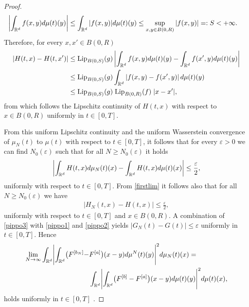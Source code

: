 \begin{proof}
	\begin{align*}
	\left|\int_{\mathbb{R}^d} f(x,y) d\mu(t)(y)\right| &\leq \int_{\mathbb{R}^d} |f(x,y)| d\mu(t)(y) \leq \sup_{x,y \in B(0,R)} |f(x,y)| =: S <+\infty.
	\end{align*}
	Therefore, for every $x, x' \in B(0,R)$
	\begin{align*}
	\left|H(t,x)-H(t,x')\right| &\leq \textup{Lip}_{B(0,S)} (g) \left|\int_{\mathbb{R}^d} f(x,y) d\mu(t)(y) - \int_{\mathbb{R}^d} f(x',y) d\mu(t)(y)\right| \\
	&\leq \textup{Lip}_{B(0,S)} (g) \int_{\mathbb{R}^d} \left|f(x,y)  - f(x',y)\right|  d\mu(t)(y)\\
	&\leq \textup{Lip}_{B(0,S)} (g) \; \textup{Lip}_{B(0,R)} (f) \; |x-x'|,
	\end{align*}
	from which follows the Lipschitz continuity of $H(t,x)$ with respect to $x \in B(0,R)$ uniformly in $t \in [0,T]$.
	
	From this uniform Lipschitz continuity and the uniform Wasserstein convergence of $\mu_N(t)$ to $\mu(t)$ with respect to $t \in [0,T]$, it follows that for every $\varepsilon > 0$ we can find $N_0(\varepsilon)$ such that for all $N \geq N_0(\varepsilon)$ it holds
	\begin{align}\label{pippo1}
		\left|\int_{\mathbb{R}^d}H(t,x)d\mu_N(t)(x) - \int_{\mathbb{R}^d}H(t,x)d\mu(t)(x)\right|\leq \frac{\varepsilon}{2},
	\end{align}
	uniformly with respect to $t \in [0,T]$. From \eqref{firstlim} it follows also that for all $N \geq N_0(\varepsilon)$ we have
	\begin{align}\label{pippo2}
	\left|H_N(t,x) - H(t,x)\right| \leq \frac{\varepsilon}{2},
	\end{align}
	uniformly with respect to $t \in [0,T]$ and $x \in B(0,R)$. A combination of \eqref{pippo3} with \eqref{pippo1} and \eqref{pippo2}  yields $|G_N(t)-G(t)| \leq \varepsilon$ uniformly in $t \in [0,T]$. Hence
	\begin{align*}
		\lim_{N\rightarrow\infty}
			\int_{\mathbb{R}^d}\Biggl|\int_{\mathbb{R}^d}\bigl(F^{[b_{N}]}-&F^{[a]}\bigr)(x-y)d\mu^{N}(t)(y)\Biggr|^2d\mu_N(t)(x) = \\
			&\int_{\mathbb{R}^d}\Biggl|\int_{\mathbb{R}^d}\bigl(F^{[b]}-F^{[a]}\bigr)(x-y)d\mu(t)(y)\Biggr|^2d\mu(t)(x),
	\end{align*}
	 holds uniformly in $t \in [0,T]$ .
	

\end{proof}
